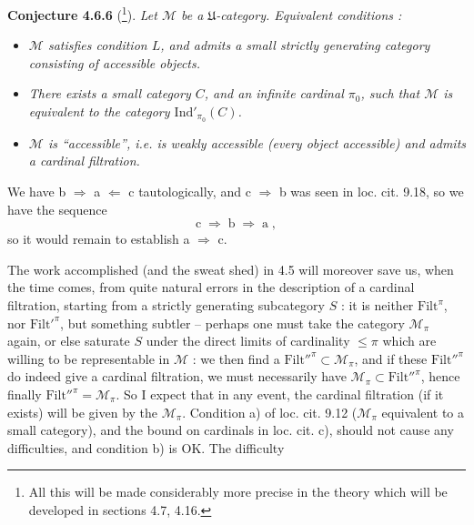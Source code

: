 \documentclass[11pt]{article}
\newcommand{\msp}[1]{\marginpar{\footnotesize [#1]}}
\newcommand{\Mc}{\mathcal{M}}
\newcommand{\U}{\mathfrak{U}}
\begin{document}
\textbf{Conjecture 4.6.6} (\footnote[61]{All this will be made considerably more precise in the theory which will be developed in sections 4.7, 4.16.}). \textit{Let $\Mc$ be a $\U$-category. Equivalent conditions :} %
\begin{itemize}[leftmargin=4em]
\item[\textit{a)}] \textit{$\Mc$ satisfies condition $L$, and admits a small strictly generating category consisting of accessible objects.}
\item[\llap{$\Uparrow$\ }\textit{b)}] \textit{There exists a small category $C$, and an infinite cardinal $\pi_0$, such that $\Mc$ is equivalent to the category $\mathrm{Ind}'_{\pi_0}(C)$.}
\item[\llap{$\Uparrow$\ }\textit{c)}] \textit{$\Mc$ is ``accessible'', i.e. is weakly accessible (every object accessible) and admits a cardinal filtration.}
\end{itemize}
We have b $\Longrightarrow$ a $\Longleftarrow$ c tautologically, and c $\Longrightarrow$ b was seen in loc. cit. 9.18, so we have the sequence
\[
\mathrm{c} \;\Longrightarrow\; \mathrm{b} \;\Longrightarrow\; \mathrm{a}\;,
\]
so it would remain to establish a $\Longrightarrow$ c.

\msp{page 155}

The work accomplished (and the sweat shed) in 4.5 will moreover save us, when the time comes, from quite natural errors in the description of a cardinal filtration, starting from a strictly generating subcategory $S$ : it is neither $\mathrm{Filt}^{\pi}$, nor $\mathrm{Filt}'^{\pi}$, but something subtler -- perhaps one must take the category $\Mc_{\pi}$ again, or else saturate $S$ under the direct limits of cardinality $\leqslant \pi$ which are willing to be representable in $\Mc$ : we then find a $\mathrm{Filt}''^{\pi} \subset \Mc_{\pi}$, and if these $\mathrm{Filt}''^{\pi}$ do indeed give a cardinal filtration, we must necessarily have $\Mc_{\pi} \subset \mathrm{Filt}''^{\pi}$, hence finally $\mathrm{Filt}''^{\pi} = \Mc_{\pi}$. So I expect that in any event, the cardinal filtration (if it exists) will be given by the $\Mc_{\pi}$. Condition a) of loc. cit. 9.12 ($\Mc_{\pi}$ equivalent to a small category), and the bound on cardinals in loc. cit. c), should not cause any difficulties, and condition b) is OK. The difficulty
\end{document}
